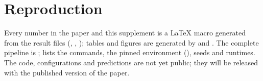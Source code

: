 \documentclass[onecolumn,10pt]{IEEEtran}
\begin{document}
\section{Reproduction}
\label{sec:s_repro}
Every number in the paper and this supplement is a LaTeX macro generated from the result files (, , ); tables and figures are generated by  and .
The complete pipeline is ;  lists the commands, the pinned environment (), seeds and runtimes.
The code, configurations and predictions are not yet public; they will be released with the published version of the paper.
\end{document}
